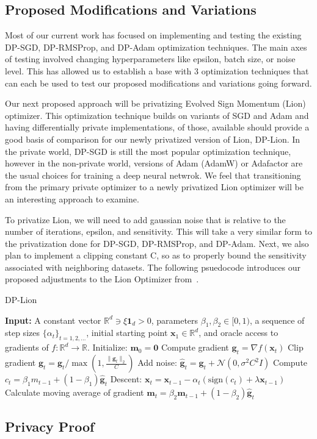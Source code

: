 \subsection{Proposed Modifications and Variations}\label{subsec:modification-and-variations}
Most of our current work has focused on implementing and testing the existing DP-SGD, DP-RMSProp, and DP-Adam optimization techniques. The main axes
of testing involved changing hyperparameters like epsilon, batch size, or noise level. This has allowed us to establish a base with 3 optimization techniques
that can each be used to test our proposed modifications and variations going forward.

Our next proposed approach will be privatizing Evolved Sign Momentum (Lion) optimizer. This optimization technique builds on variants of SGD and Adam and having 
differentially private implementations, of those, available should provide a good basis of comparison for our newly privatized version of Lion, DP-Lion. In the private world,
DP-SGD is still the most popular optimization technique, however in the non-private world, versions of Adam (AdamW) or Adafactor are the usual choices for training
a deep neural netwrok. \cite{chen2023symbolicdiscoveryoptimizationalgorithms} We feel that transitioning from the primary private optimizer to a newly privatized Lion optimizer
will be an interesting approach to examine.

To privatize Lion, we will need to add gaussian noise that is relative to the number of iterations, epsilon, and sensitivity. This will take a very similar form to the privatization
done for DP-SGD, DP-RMSProp, and DP-Adam. Next, we also plan to implement a clipping constant C, so as to properly bound the sensitivity associated with neighboring datasets. The following psuedocode
introduces our proposed adjustments to the Lion Optimizer from~\cite{chen2023symbolicdiscoveryoptimizationalgorithms}.


\begin{algorithm}
    \caption{DP-Lion}
    \label{alg:lion}
    \begin{algorithmic}[1]
        \State \textbf{Input:} A constant vector $\mathbb{R}^d \ni \xi \mathbf{1}_d > 0$, parameters $\beta_1, \beta_2 \in [0, 1)$, a sequence of step sizes $\{\alpha_t\}_{t=1,2,\dots}$, initial starting point $\mathbf{x}_1 \in \mathbb{R}^d$, and oracle access to gradients of $f : \mathbb{R}^d \to \mathbb{R}$.
        \State Initialize: $\mathbf{m}_0 = \mathbf{0}$
            \State Compute gradient $\mathbf{g}_t = \nabla f(\mathbf{x}_t)$
            \State Clip gradient $\mathbf{g}_t = \mathbf{g}_t / \max(1, \frac{\lVert \mathbf{g}_t \rVert_2}{C})$
            \State Add noise: $\hat{\mathbf{g}}_t = \mathbf{g}_t + \mathcal{N}(0, \sigma^2 C^2 I)$
            \State Compute $c_{t} = \beta_1 m_{t-1} + (1 - \beta_1) \hat{\mathbf{g}}_t$
            \State Descent: $\mathbf{x}_t = \mathbf{x}_{t-1} - \alpha_t (\text{sign}(c_{t}) + \lambda \mathbf{x}_{t-1})$
            \State Calculate moving average of gradient $\mathbf{m}_t = \beta_2 \mathbf{m}_{t-1} + (1 - \beta_2) \hat{\mathbf{g}}_t$
        \EndFor
    \end{algorithmic}
\end{algorithm}


\subsection{Privacy Proof}\label{subsec:incremental-improvements}
